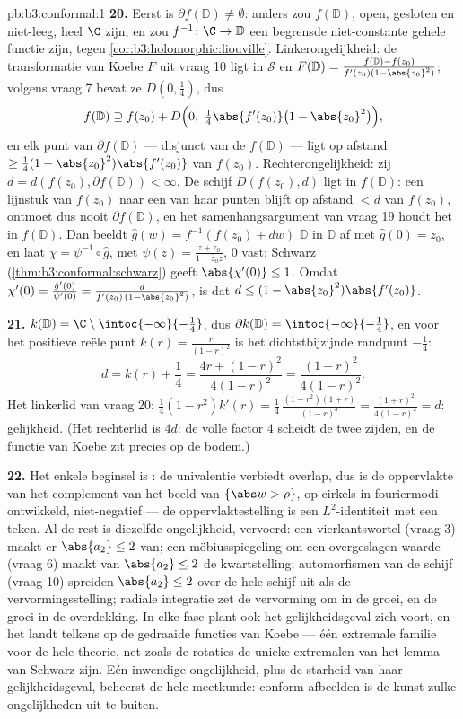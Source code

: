\begin{solution}{pb:b3:conformal:1}
\textbf{20.} Eerst is $\partial f(\mathbb D) \neq \emptyset$:
anders zou $f(\mathbb D)$, open, gesloten en niet-leeg, heel $\C$
zijn, en zou $f^{-1} \colon \C \to \mathbb D$ een begrensde
niet-constante gehele functie zijn, tegen
\cref{cor:b3:holomorphic:liouville}. Linkerongelijkheid: de
transformatie van Koebe $F$ uit vraag 10 ligt in $\mathcal S$ en
$F(\mathbb D) = \frac{f(\mathbb D) -
f(z_0)}{f'(z_0)(1-\abs{z_0}^2)}$; volgens vraag 7 bevat ze $D(0,
\frac14)$, dus
\[
f(\mathbb D) \supseteq f(z_0) + D\Bigl(0,\
\tfrac14\abs{f'(z_0)}\bigl(1 - \abs{z_0}^2\bigr)\Bigr) ,
\]
en elk punt van $\partial f(\mathbb D)$ --- disjunct van de \omterm{def:b3:topology:topology}{open
verzameling} $f(\mathbb D)$ --- ligt op afstand $\geq
\frac14(1-\abs{z_0}^2)\abs{f'(z_0)}$ van $f(z_0)$.
Rechterongelijkheid: zij $d = d(f(z_0), \partial f(\mathbb D)) <
\infty$. De schijf $D(f(z_0), d)$ ligt in $f(\mathbb D)$: een
lijnstuk van $f(z_0)$ naar een van haar punten blijft op afstand
$< d$ van $f(z_0)$, ontmoet dus nooit $\partial f(\mathbb D)$, en
het samenhangsargument van vraag 19 houdt het in $f(\mathbb D)$.
Dan beeldt $\hat g(w) = f^{-1}(f(z_0) + dw)$ $\mathbb D$ in
$\mathbb D$ af met $\hat g(0) = z_0$, en laat $\chi =
\psi^{-1}\circ\hat g$, met $\psi(z) = \frac{z + z_0}{1 + \bar
z_0z}$, $0$ vast: Schwarz (\cref{thm:b3:conformal:schwarz}) geeft
$\abs{\chi'(0)} \leq 1$. Omdat $\chi'(0) = \frac{\hat
g'(0)}{\psi'(0)} = \frac{d}{f'(z_0)\,(1 - \abs{z_0}^2)}$, is dat
$d \leq (1 - \abs{z_0}^2)\abs{f'(z_0)}$.

\textbf{21.} $k(\mathbb D) = \C\setminus
\intoc{-\infty}{-\frac14}$, dus $\partial k(\mathbb D) =
\intoc{-\infty}{-\frac14}$, en voor het positieve reële punt
$k(r) = \frac r{(1-r)^2}$ is het dichtstbijzijnde randpunt
$-\frac14$:
\[
d = k(r) + \frac14 = \frac{4r + (1-r)^2}{4(1-r)^2}
= \frac{(1+r)^2}{4(1-r)^2} .
\]
Het linkerlid van vraag 20: $\frac14(1 - r^2)k'(r) =
\frac14\,\frac{(1-r^2)(1+r)}{(1-r)^3} =
\frac{(1+r)^2}{4(1-r)^2} = d$: gelijkheid. (Het rechterlid is
$4d$: de volle factor $4$ scheidt de twee zijden, en de functie
van Koebe zit precies op de bodem.)

\textbf{22.} Het enkele beginsel is : de univalentie
verbiedt overlap, dus is de oppervlakte van het complement van
het beeld van $\{\abs w > \rho\}$, op cirkels in fouriermodi
ontwikkeld, niet-negatief --- de oppervlaktestelling is een
$L^2$-identiteit met een teken. Al de rest is diezelfde
ongelijkheid, vervoerd: een vierkantswortel (vraag 3) maakt er
$\abs{a_2} \leq 2$ van; een möbiusspiegeling om een overgeslagen
waarde (vraag 6) maakt van $\abs{a_2} \leq 2$ de kwartstelling;
automorfismen van de schijf (vraag 10) spreiden $\abs{a_2} \leq
2$ over de hele schijf uit als de vervormingsstelling; radiale
integratie zet de vervorming om in de groei, en de groei in de
overdekking. In elke fase plant ook het gelijkheidsgeval zich
voort, en het landt telkens op de gedraaide functies van Koebe
--- één extremale familie voor de hele theorie, net zoals de
rotaties de unieke extremalen van het lemma van Schwarz zijn. Eén
inwendige ongelijkheid, plus de starheid van haar
gelijkheidsgeval, beheerst de hele meetkunde: conform afbeelden
is de kunst zulke ongelijkheden uit te buiten.


\end{solution}

